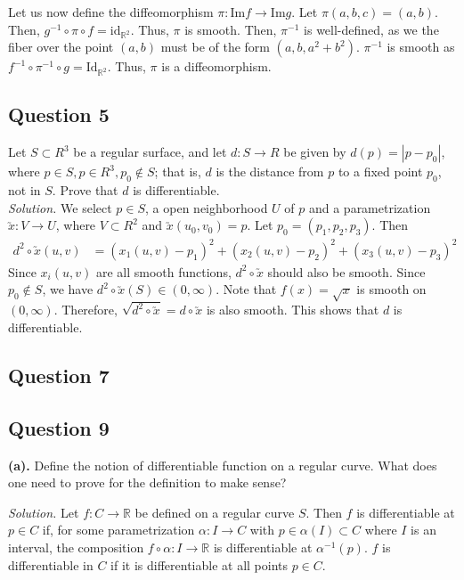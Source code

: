\documentclass[12pt]{article}
\begin{document}
Let us now define the diffeomorphism
$\pi : \mathrm{Im} f \to \mathrm{Im} g.$
Let $\pi (a, b, c) = (a, b).$ Then, $g^{-1}\circ\pi \circ f = \mathrm{id}_{\mathbb R^2}.$ Thus, $\pi$ is smooth.
Then, $\pi^{-1}$ is well-defined, as we the fiber over the point $(a, b)$ must be of the form $(a, b, a^2 + b^2).$
$\pi^{-1}$ is smooth as $f^{-1} \circ \pi^{-1} \circ g = \mathrm{Id}_{\mathbb R^2}.$ Thus, $\pi$ is a diffeomorphism.

\subsection*{Question 5}
Let $S \subset R^3$ be a regular surface, and let $d:S\to R$ be given by $d(p)=|p- p_0|$, where $p \in S, p \in R^3, p_0 \notin S$; that is, $d$ is the distance from $p$ to a fixed point $p_0$, not in $S$. Prove that $d$ is differentiable.\\

\textit{Solution.} We select $p\in S$, a open neighborhood $U$ of $p$ and a parametrization $\utilde{x}: V \to U$, where $V\subset R^2$ and $\utilde{x}(u_0,v_0) = p$. Let $p_0=(p_1,p_2,p_3)$. Then \begin{align*}
    d^2\circ\utilde{x}(u,v) &= (x_1(u,v)-p_1)^2+(x_2(u,v)-p_2)^2+(x_3(u,v)-p_3)^2
\end{align*}
Since $x_i(u,v)$ are all smooth functions, $d^2\circ \utilde{x}$ should also be smooth. Since $p_0\notin S$, we have $d^2\circ\utilde{x}(S)\in (0,\infty)$. Note that $f(x)=\sqrt{x}$ is smooth on $(0,\infty)$. Therefore, $\sqrt{d^2\circ\utilde{x}} = d\circ\utilde{x}$ is also smooth. This shows that $d$ is differentiable.

\subsection*{Question 7}

\subsection*{Question 9}

\textbf{(a).} Define the notion of differentiable function on a regular curve.
              What does one need to prove for the definition to make sense?

\emph{Solution.}
Let \(f: C\to \mathbb{R}\) be defined on a regular curve \(S\).
Then \(f\) is differentiable at \(p\in C\) if,
for some parametrization \(\alpha: I\to C\) with \(p\in \alpha(I)\subset C\) where \(I\) is an interval,
the composition \(f\circ \alpha: I\to \mathbb{R}\) is differentiable at \(\alpha^{-1}(p)\).
\(f\) is differentiable in \(C\) if it is differentiable at all points \(p\in C\).
\end{document}
